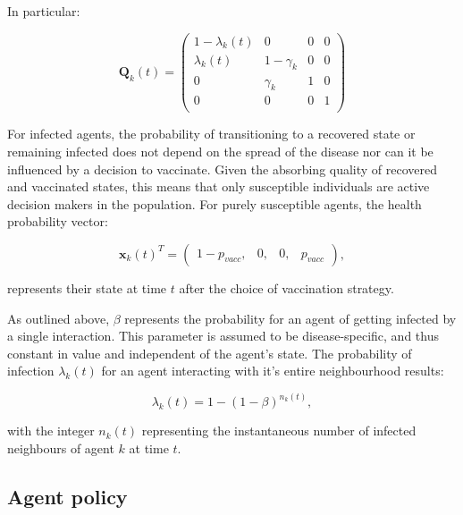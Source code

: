 \documentclass[11pt]{article}
\begin{document}
In particular: 

\begin{equation}\label{eq:3}			%
	 \mathbf{Q}_k(t) = 
	 \left (\begin{array}{cccc} 1-\lambda_{k}(t)&0&0&0 \\
	 	\lambda_{k}(t)&1-\gamma_{k}&0&0 \\
		0&\gamma_{k}&1&0 \\
		0&0&0&1 \\
	  \end{array} \right)
\end{equation}

For infected agents, the probability of transitioning to a recovered state or remaining infected does not depend on the spread of the disease nor can it be influenced by a decision to vaccinate. Given the absorbing quality of recovered and vaccinated states, this means that only susceptible individuals are active decision makers in the population. For purely susceptible agents, the health probability vector:

\begin{equation}\label{eq:4}
	\mathbf{x}_k(t)^T=\left(\begin{array}{cccc} 1-p_{vacc},&0,&0,&p_{vacc}  \end{array} \right),
\end{equation} 

represents their state at time \(t\) after the choice of vaccination strategy. 


As outlined above, \(\beta\) represents the probability for an agent of getting infected by a single interaction. This parameter is assumed to be disease-specific, and thus constant in value and independent of the agent's state. The probability of infection \(\lambda_{k}(t)\) for an agent interacting with it's entire neighbourhood results:

\begin{equation}\label{eq:5}
	\lambda_{k}(t)=1-(1-\beta)^{n_{k}(t)},
\end{equation}

with the integer \(n_{k}(t)\) representing the instantaneous number of infected neighbours of agent \(k\) at time \(t\). %

\subsection{Agent policy}
\end{document}
